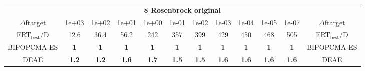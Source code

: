 \begin{tabular}{cccccccccccc}
 & \multicolumn{10}{c}{{\normalsize \textbf{8 Rosenbrock original}}}\\
$\Delta$ftarget& 1e+03& 1e+02& 1e+01& 1e+00& 1e-01& 1e-02& 1e-03& 1e-04& 1e-05& 1e-07 & $\Delta$ftarget \\
ERT$_{\textrm{best}}$/D& 12.6& 36.4& 56.2& 242& 357& 399& 429& 450& 468& 505 & ERT$_{\textrm{best}}$/D \\
\hline
BIPOPCMA-ES & \textbf{1} & \textbf{1} & \textbf{1} & \textbf{1} & \textbf{1} & \textbf{1} & \textbf{1} & \textbf{1} & \textbf{1} & \textbf{1} & BIPOPCMA-ES \cite{add_an_entry_for_BIPOPCMA-ES_in_bbob.bib}\\
DEAE & \textbf{1.2} & \textbf{1.2} & \textbf{1.6} & \textbf{1.7} & \textbf{1.5} & \textbf{1.5} & \textbf{1.6} & \textbf{1.6} & \textbf{1.6} & \textbf{1.6} & DEAE \cite{add_an_entry_for_DEAE_in_bbob.bib}
\end{tabular}
